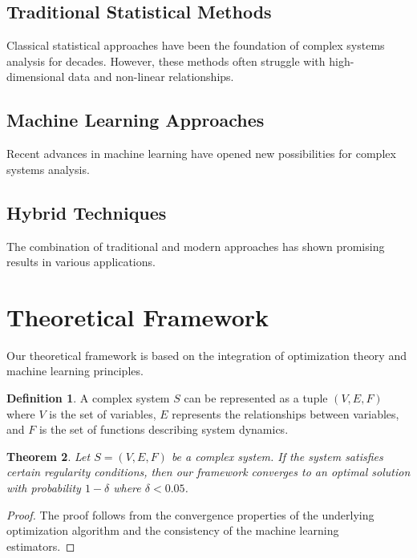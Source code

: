 \documentclass[12pt, letterpaper, onecolumn, final]{article}
\theoremstyle{plain}
\newtheorem{theorem}{Theorem}[section]
\theoremstyle{definition}
\newtheorem{definition}[theorem]{Definition}
\theoremstyle{remark}
\begin{document}
\subsection{Traditional Statistical Methods}
\label{sec:traditional-methods}

\lipsum[10-11] Classical statistical approaches have been the foundation of complex systems analysis for decades. \citep{foundational2020} However, these methods often struggle with high-dimensional data and non-linear relationships.

\subsection{Machine Learning Approaches}
\label{sec:ml-approaches}

\lipsum[12] Recent advances in machine learning have opened new possibilities for complex systems analysis. \lipsum[13-14]

\subsection{Hybrid Techniques}
\label{sec:hybrid}

\lipsum[15] The combination of traditional and modern approaches has shown promising results in various applications. \lipsum[16]

\section{Theoretical Framework}
\label{sec:theory}

\lipsum[17-18] Our theoretical framework is based on the integration of optimization theory and machine learning principles.

\begin{definition}
A complex system $S$ can be represented as a tuple $(V, E, F)$ where $V$ is the set of variables, $E$ represents the relationships between variables, and $F$ is the set of functions describing system dynamics.
\end{definition}

\lipsum[19]

\begin{theorem}
Let $S = (V, E, F)$ be a complex system. If the system satisfies certain regularity conditions, then our framework converges to an optimal solution with probability $1-\delta$ where $\delta < 0.05$.
\end{theorem}

\begin{proof}
The proof follows from the convergence properties of the underlying optimization algorithm and the consistency of the machine learning estimators. \lipsum[20]
\end{proof}
\end{document}
